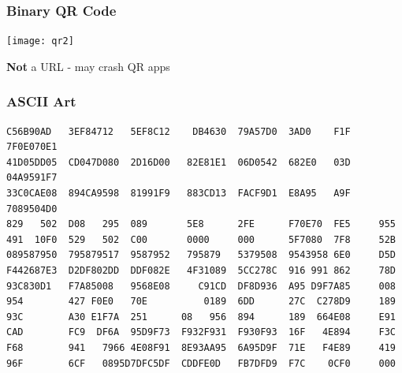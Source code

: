 \documentclass{beamer}
\begin{document}
\begin{frame}[fragile]
\frametitle{Binary QR Code}
\texttt{[image: qr2]}

\textbf{Not} a URL - may crash QR apps
\end{frame}

\begin{frame}[fragile]
\frametitle{ASCII Art}
\scriptsize{
    \begin{Verbatim}[commandchars=\\\{\}]
C56B90AD   3EF84712   5EF8C12    DB4630  79A57D0  3AD0    F1F  7F0E070E1
41D05DD05  CD047D080  2D16D00   82E81E1  06D0542  682E0   03D  04A9591F7
33C0CAE08  894CA9598  81991F9   883CD13  FACF9D1  E8A95   A9F  7089504D0
829   502  D08   295  089       5E8      2FE      F70E70  FE5     955
491  10F0  529   502  C00       0000     000      5F7080  7F8     52B
089587950  795879517  9587952   795879   5379508  9543958 6E0     D5D
F442687E3  D2DF802DD  DDF082E   4F31089  5CC278C  916 991 862     78D
93C830D1   F7A85008   9568E08     C91CD  DF8D936  A95 D9F7A85     008
954        427 F0E0   70E          0189  6DD      27C  C278D9     189
93C        A30 E1F7A  251      08   956  894      189  664E08     E91
CAD        FC9  DF6A  95D9F73  F932F931  F930F93  16F   4E894     F3C
F68        941   7966 4E08F91  8E93AA95  6A95D9F  71E   F4E89     419
96F        6CF   0895D7DFC5DF  CDDFE0D   FB7DFD9  F7C    0CF0     000
    \end{Verbatim}
}
\end{frame}
\end{document}

